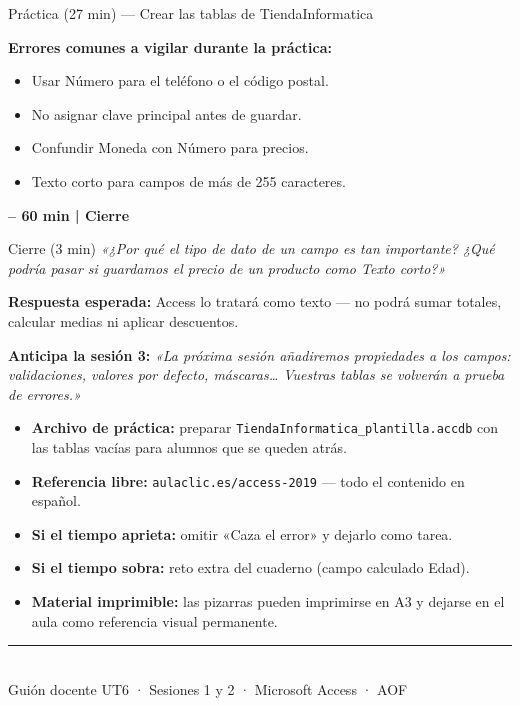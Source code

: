 \documentclass[12pt,a4paper]{article}
\newcommand{\tiempo}[1]{%
  \vspace{4pt}
  \begin{tcolorbox}[
    colback=timercolor!12, colframe=timercolor,
    left=4pt, right=4pt, top=3pt, bottom=3pt,
    boxrule=1pt, sharp corners, breakable, enhanced]
  \textbf{\large\textcolor{timercolor}{\faIcon{clock}\quad #1}}
  \end{tcolorbox}\vspace{2pt}}
\begin{document}
\begin{practbox}{\quad Práctica (27 min) — Crear las tablas de TiendaInformatica}
\begin{aviso}
\;\textbf{Errores comunes a vigilar durante la práctica:}
\begin{itemize}[leftmargin=1.5em, itemsep=1pt]
  \item Usar Número para el teléfono o el código postal.
  \item No asignar clave principal antes de guardar.
  \item Confundir Moneda con Número para precios.
  \item Texto corto para campos de más de 255 caracteres.
\end{itemize}
\end{aviso}
\end{practbox}

\tiempo{57 – 60 min \normalfont\normalsize | Cierre}

\begin{actbox}{\quad Cierre (3 min)}
\textit{«¿Por qué el tipo de dato de un campo es tan importante?
¿Qué podría pasar si guardamos el precio de un producto como Texto corto?»}

\smallskip
\textbf{Respuesta esperada:} Access lo tratará como texto — no podrá sumar totales,
calcular medias ni aplicar descuentos.

\medskip
\textbf{Anticipa la sesión 3:}
\textit{«La próxima sesión añadiremos propiedades a los campos: validaciones,
valores por defecto, máscaras\ldots{} Vuestras tablas se volverán a prueba de errores.»}
\end{actbox}

\vspace{6pt}
\begin{tcolorbox}[colback=graylight, colframe=gray!40,
                  title=\textbf{Notas y recursos para el docente},
                  colbacktitle=gray!50, fonttitle=\bfseries\color{white},
                  breakable, enhanced]
\small
\begin{itemize}[leftmargin=1.5em, itemsep=2pt]
  \item \textbf{Archivo de práctica:} preparar \texttt{TiendaInformatica\_plantilla.accdb}
        con las tablas vacías para alumnos que se queden atrás.
  \item \textbf{Referencia libre:} \texttt{aulaclic.es/access-2019}
        — todo el contenido en español.
  \item \textbf{Si el tiempo aprieta:} omitir «Caza el error» y dejarlo como tarea.
  \item \textbf{Si el tiempo sobra:} reto extra del cuaderno (campo calculado Edad).
  \item \textbf{Material imprimible:} las pizarras pueden imprimirse en A3
        y dejarse en el aula como referencia visual permanente.
\end{itemize}
\end{tcolorbox}

\vfill
\begin{center}
{\color{accessred}\rule{0.4\linewidth}{1pt}}\\[4pt]
{\small\color{gray} Guión docente UT6 · Sesiones 1 y 2 · Microsoft Access · AOF}
\end{center}
\end{document}

